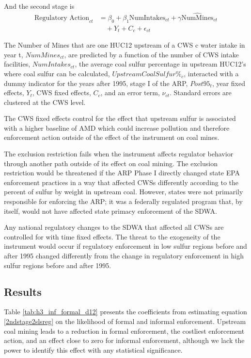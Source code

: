 \documentclass{article}
\begin{document}
And the second stage is
\begin{equation}\label{2ndstage2slsreg}
\begin{split}
\text{Regulatory Action}_{ct} &= \beta_0 + \beta_1\text{NumIntakes}_{ct} + \gamma\widehat{\text{NumMines}}_{ct} \\
&\quad + Y_t + C_c + \epsilon_{ct}
\end{split}
\end{equation}

The Number of Mines that are one HUC12 upstream of a CWS c water intake in year t, $NumMines_{ct}$, are predicted by a function of the number of CWS intake facilities, $NumIntakes_{ct}$, the average coal sulfur percentage in upstream HUC12's where coal sulfur can be calculated, $UpstreamCoalSulfur\%_c$, interacted with a dummy indicator for the years after 1995, stage I of the ARP, $Post95_t$, year fixed effects, $Y_t$, CWS fixed effects, $C_c$, and an error term, $\nu_{ct}$. Standard errors are clustered at the CWS level.

The CWS fixed effects control for the effect that upstream sulfur is associated with a higher baseline of AMD which could increase pollution and therefore enforcement action outside of the effect of the instrument on coal mines.

The exclusion restriction fails when the instrument affects regulator behavior through another path outside of its effect on coal mining. The exclusion restriction would be threatened if the ARP Phase I directly changed state EPA enforcement practices in a way that affected CWSs differently according to the percent of sulfur by weight in upstream coal. However, states were not primarily responsible for enforcing the ARP; it was a federally regulated program that, by itself, would not have affected state primacy enforcement of the SDWA.

Any national regulatory changes to the SDWA that affected all CWSs are controlled for with time fixed effects. The threat to the exogeneity of the instrument would occur if regulatory enforcement in low sulfur regions before and after 1995 changed differently from the change in regulatory enforcement in high sulfur regions before and after 1995.

\subsection{Results}

Table \ref{tab:h3_inf_formal_d12} presents the coefficients from estimating equation \ref{2ndstage2slsreg} on the likelihood of formal and informal enforcement. Upstream coal mining leads to a reduction in formal enforcement, the costliest enforcement action, and an effect close to zero for informal enforcement, although we lack the power to identify this effect with any statistical significance. 
\end{document}
